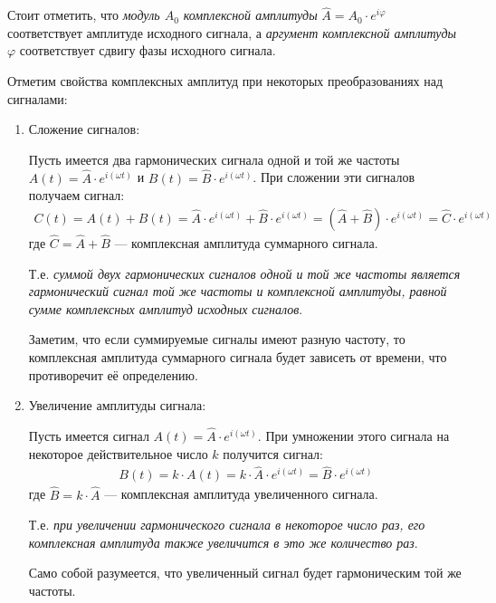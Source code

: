 \documentclass[a4paper, usenames, dvipsnames]{article}
\begin{document}
Стоит отметить, что {\it модуль $A_0$ комплексной амплитуды}
$\hat{A} = A_0 \cdot e^{i\varphi}$ соответствует амплитуде исходного сигнала,
а {\it аргумент комплексной амплитуды $\varphi$} соответствует
сдвигу фазы исходного сигнала.

Отметим свойства комплексных амплитуд при некоторых преобразованиях над сигналами:
\begin{enumerate}
    \item Сложение сигналов:

          Пусть имеется два гармонических сигнала одной и той же частоты
          $A(t) = \hat{A} \cdot e^{i(\omega t)}$ и $B(t) = \hat{B} \cdot e^{i(\omega t)}$.
          При сложении эти сигналов получаем сигнал:
          \begin{gather*}
              C(t) = A(t) + B(t) = \hat{A} \cdot e^{i(\omega t)} + \hat{B} \cdot e^{i(\omega t)}
              = (\hat{A} + \hat{B}) \cdot e^{i(\omega t)} = \hat{C} \cdot e^{i(\omega t)}
          \end{gather*}
          где $\hat{C} = \hat{A} + \hat{B}$ --- комплексная амплитуда суммарного сигнала.

          Т.е. {\it суммой двух гармонических сигналов одной и той же частоты
          является гармонический сигнал той же частоты и комплексной амплитуды,
          равной сумме комплексных амплитуд исходных сигналов}.

          Заметим, что если суммируемые сигналы имеют разную частоту,
          то комплексная амплитуда суммарного сигнала будет зависеть от времени,
          что противоречит её определению.

    \item Увеличение амплитуды сигнала:\label{Увеличение амплитуды по фазе}

          Пусть имеется сигнал $A(t) = \hat{A} \cdot e^{i(\omega t)}$.
          При умножении этого сигнала на некоторое действительное число $k$
          получится сигнал:
          \begin{gather*}
              B(t) = k \cdot A(t) = k \cdot \hat{A} \cdot e^{i(\omega t)} = \hat{B} \cdot e^{i(\omega t)}
          \end{gather*}
          где $\hat{B} = k \cdot \hat{A}$ --- комплексная амплитуда увеличенного сигнала.

          Т.е. {\it при увеличении гармонического сигнала в некоторое число раз,
          его комплексная амплитуда также увеличится в это же количество раз}.

          Само собой разумеется, что увеличенный сигнал будет гармоническим той же частоты.


\end{enumerate}
\end{document}
